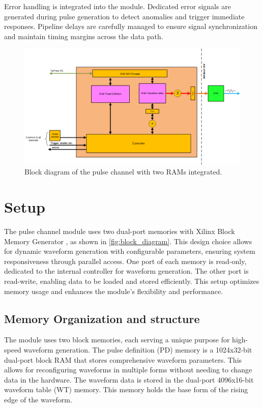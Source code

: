 Error handling is integrated into the module. Dedicated error signals are generated during pulse generation to detect anomalies and trigger immediate responses. Pipeline delays are carefully managed to ensure signal synchronization and maintain timing margins across the data path.

\begin{figure}[h]
    \centering
    \includegraphics[width=1.0\linewidth]{figures/3.1.png}
    \caption{Block diagram of the pulse channel with two RAMs integrated.}
    \label{fig:block_diagram}
\end{figure}

\section{Setup}

The pulse channel module uses two dual-port memories with Xilinx Block Memory Generator \cite{blockmemgen}, as shown in \autoref{fig:block_diagram}. This design choice allows for dynamic waveform generation with configurable parameters, ensuring system responsiveness through parallel access. One port of each memory is read-only, dedicated to the internal controller for waveform generation. The other port is read-write, enabling data to be loaded and stored efficiently. This setup optimizes memory usage and enhances the module's flexibility and performance.

\subsection{Memory Organization and structure}

The module uses two block memories, each serving a unique purpose for high-speed waveform generation. The pulse definition (PD) memory is a 1024x32-bit dual-port block RAM that stores comprehensive waveform parameters. This allows for reconfiguring waveforms in multiple forms without needing to change data in the hardware. The waveform data is stored in the dual-port 4096x16-bit waveform table (WT) memory. This memory holds the base form of the rising edge of the waveform.

